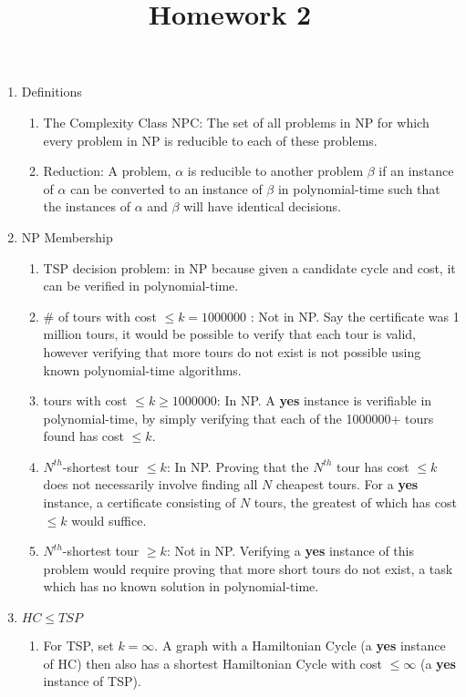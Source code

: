 \documentclass[12pt, letter]{article}
\title{ Homework 2 }
\begin{document}
\maketitle
\thispagestyle{fancy}

\begin{enumerate}
\item Definitions
\begin{enumerate}
\item The Complexity Class NPC: The set of all problems in NP for which every problem in NP is reducible to each of these problems.
\item Reduction: A problem, $\alpha$ is reducible to another problem $\beta$ if an instance of $\alpha$ can be converted to an instance of $\beta$ in polynomial-time such that the instances of $\alpha$ and $\beta$ will have identical decisions.
\end{enumerate}
\item NP Membership
\begin{enumerate}
\item TSP decision problem: in NP because given a candidate cycle and cost, it can be verified in polynomial-time.
\item \# of tours with cost $\le k = 1000000$ : Not in NP. Say the certificate was 1 million tours, it would be possible to verify that each tour is valid, however verifying that more tours do not exist is not possible using known polynomial-time algorithms.
\item  tours with cost $\le k \ge 1000000$: In NP. A \textbf{yes} instance is verifiable in polynomial-time, by simply verifying that each of the 1000000+ tours found has cost $\le k$.
\item $N^{th}$-shortest tour $\le k$: In NP. Proving that the $N^{th}$ tour has cost $\le k$ does not necessarily involve finding all $N$ cheapest tours. For a \textbf{yes} instance, a certificate consisting of $N$ tours, the greatest of which has cost $\le k$ would suffice.
\item $N^{th}$-shortest tour $\ge k$: Not in NP. Verifying a \textbf{yes} instance of this problem would require proving that more short tours do not exist, a task which has no known solution in polynomial-time.
\end{enumerate}
\item $HC \le TSP$
 \begin{enumerate}
	\item For TSP, set $k=\infty$. A graph with a Hamiltonian Cycle (a \textbf{yes} instance of HC) then also has a shortest Hamiltonian Cycle with cost $\le \infty$ (a \textbf{yes} instance of TSP).

\end{enumerate}
\end{enumerate}
\end{document}

